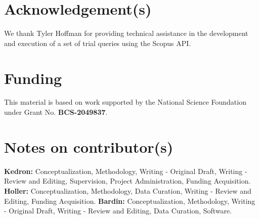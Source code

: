 \documentclass[]{interact}
\theoremstyle{plain}%
\theoremstyle{definition}
\theoremstyle{remark}
\begin{document}
\section*{Acknowledgement(s)}
We thank Tyler Hoffman for providing technical assistance in the development and execution of a set of trial queries using the Scopus API.

\section*{Funding}
This material is based on work supported by the National Science Foundation under Grant No. \textbf{BCS-2049837}.

\section*{Notes on contributor(s)}
\textbf{Kedron:} Conceptualization, Methodology, Writing - Original Draft, Writing - Review and Editing, Supervision, Project Administration, Funding Acquisition. \textbf{Holler:} Conceptualization, Methodology, Data Curation, Writing - Review and Editing, Funding Acquisition. \textbf{Bardin:} Conceptualization, Methodology, Writing - Original Draft, Writing - Review and Editing, Data Curation, Software.

\newpage
%
\printbibliography
\end{document}
